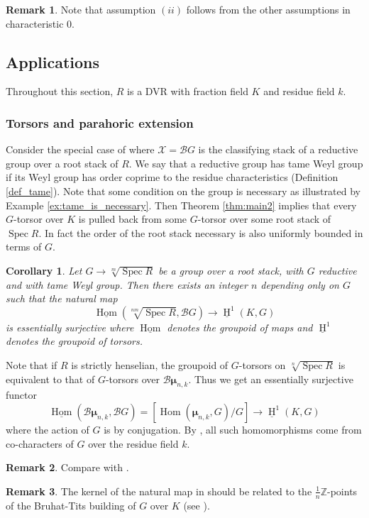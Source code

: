 \documentclass{amsart}
\newtheorem{corollary}[corollary]{Corollary}
\theoremstyle{definition}
\newtheorem{remark}[remark]{Remark}
\newcommand{\cX}{\mathcal{X}}
\newcommand{\cB}{\mathcal{B}}
\newcommand{\oH}{\operatorname{H}}
\newcommand{\bmu}{\pmb{\mu}}
\DeclareMathOperator{\Hom}{Hom}
\newcommand{\spec}{\operatorname{Spec}}
\begin{document}
\begin{remark}
    Note that assumption $(ii)$ follows from the other assumptions in characteristic $0$. 
\end{remark}

\subsection{Applications}\label{subsection:applications}Throughout this section, $R$ is a DVR with fraction field $K$ and residue field $k$. 

\subsubsection{Torsors and parahoric extension} Consider the special case of  where $\cX = \cB G$ is the classifying stack of a reductive group over a root stack of $R$. We say that a reductive group has tame Weyl group if its Weyl group has order coprime to the residue characteristics (Definition \ref{def_tame}). Note that some condition on the group is necessary as illustrated by Example \ref{ex:tame_is_necessary}. Then Theorem \ref{thm:main2} implies that every $G$-torsor over $K$ is pulled back from some $G$-torsor over some root stack of $\spec R$. In fact the order of the root stack necessary is also uniformly bounded in terms of $G$. 

\begin{corollary}\label{cor:torsors}
    Let $G \to \sqrt[m]{\spec R}$ be a group over a root stack, with $G$ reductive and with tame Weyl group. Then there exists an integer $n$ depending only on $G$ such that the natural map 
    $$
    \underline{\Hom}(\sqrt[nm]{\spec R}, \cB G) \to \underline{\oH}^1(K,G)
    $$
    is essentially surjective where $\underline{\Hom}$ denotes the groupoid of maps and $\underline{\oH}^1$ denotes the groupoid of torsors.  
\end{corollary}

Note that if $R$ is strictly henselian, the groupoid of $G$-torsors on $\sqrt[n]{\spec R}$ is equivalent to that of $G$-torsors over $\cB \bmu_{n,k}$. Thus we get an essentially surjective functor 
$$
\underline{\Hom}(\cB \bmu_{n,k}, \cB G) = \left[\Hom(\bmu_{n,k}, G)/G\right] \to \underline{\oH}^1(K,G)
$$
where the action of $G$ is by conjugation. By \cite[Lemma 7.1]{martens2015}, all such homomorphisms come from co-characters of $G$ over the residue field $k$. 

\begin{remark}
Compare  with \cite[Lemma 3.5(d)]{ED_specialization}.
\end{remark}
\begin{remark} 
The kernel of the natural map in  should be related to the $\frac{1}{n}\mathbb{Z}$-points of the Bruhat-Tits building of $G$ over $K$ (see \cite[Theorem 3.17]{groechenig2025twistedpointsquotientstacks}).
\end{remark}
\end{document}
